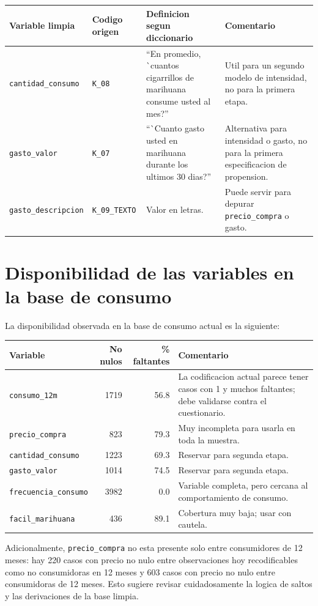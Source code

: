 \documentclass[11pt]{article}
\begin{document}
\begin{longtable}{p{3cm} p{2.2cm} p{6cm} p{4.2cm}}
\toprule
Variable limpia & Codigo origen & Definicion segun diccionario & Comentario \\
\midrule
\endhead
\texttt{cantidad\_consumo} & \texttt{K\_08} & ``En promedio, \`{ }cuantos cigarrillos de marihuana consume usted al mes?'' & Util para un segundo modelo de intensidad, no para la primera etapa. \\
\texttt{gasto\_valor} & \texttt{K\_07} & ``\`{ }Cuanto gasto usted en marihuana durante los ultimos 30 dias?'' & Alternativa para intensidad o gasto, no para la primera especificacion de propension. \\
\texttt{gasto\_descripcion} & \texttt{K\_09\_TEXTO} & Valor en letras. & Puede servir para depurar \texttt{precio\_compra} o gasto. \\
\bottomrule
\end{longtable}

\section{Disponibilidad de las variables en la base de consumo}

La disponibilidad observada en la base de consumo actual es la siguiente:

\begin{longtable}{p{4cm} r r p{5.5cm}}
\toprule
Variable & No nulos & \% faltantes & Comentario \\
\midrule
\endhead
\texttt{consumo\_12m} & 1719 & 56.8 & La codificacion actual parece tener casos con 1 y muchos faltantes; debe validarse contra el cuestionario. \\
\texttt{precio\_compra} & 823 & 79.3 & Muy incompleta para usarla en toda la muestra. \\
\texttt{cantidad\_consumo} & 1223 & 69.3 & Reservar para segunda etapa. \\
\texttt{gasto\_valor} & 1014 & 74.5 & Reservar para segunda etapa. \\
\texttt{frecuencia\_consumo} & 3982 & 0.0 & Variable completa, pero cercana al comportamiento de consumo. \\
\texttt{facil\_marihuana} & 436 & 89.1 & Cobertura muy baja; usar con cautela. \\
\bottomrule
\end{longtable}

Adicionalmente, \texttt{precio\_compra} no esta presente solo entre consumidores de 12 meses:
hay 220 casos con precio no nulo entre observaciones hoy recodificables como no consumidoras en 12 meses
y 603 casos con precio no nulo entre consumidoras de 12 meses.
Esto sugiere revisar cuidadosamente la logica de saltos y las derivaciones de la base limpia.
\end{document}
